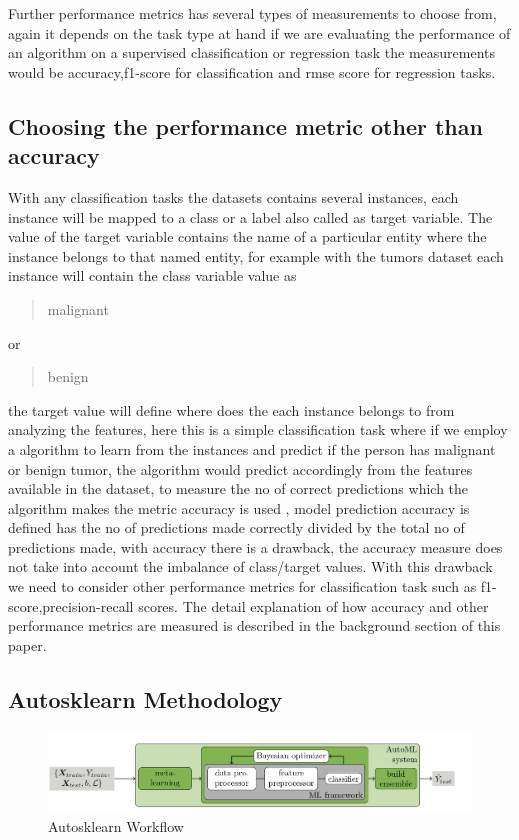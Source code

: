 Further performance metrics has several types of measurements to choose from, again it depends on the task type at hand if we are evaluating the performance of an algorithm on a supervised classification or regression task the measurements would be accuracy,f1-score for classification and rmse score for regression tasks.

\subsection{Choosing the performance metric other than accuracy}
    
 With any classification tasks the datasets contains several instances, each instance will be mapped to a class or a label also called as target variable. The value of the target variable contains the name of a particular entity where the instance belongs to that named entity, for example with the tumors dataset each instance will contain the class variable value as \blockquote{malignant} or \blockquote{benign} the target value will define where does the each instance belongs to from analyzing the features, here this is a simple classification task where if we employ a algorithm to learn from the instances and predict if the person has malignant or benign tumor, the algorithm would predict accordingly from the features available in the dataset, to measure the no of correct predictions which the algorithm makes the metric accuracy is used , model prediction accuracy is defined has the no of predictions made correctly divided by the total no of predictions made, with accuracy there is a drawback, the accuracy measure does not take into account the imbalance of class/target values. With this drawback we need to consider other performance metrics for classification task such as f1-score,precision-recall scores. The detail explanation of how accuracy and other performance metrics are measured is described in the background section of this paper.

 
    
\subsection{Autosklearn Methodology}
    
    \begin{figure}[!h]
    	\centering
    	\includegraphics[width=1.1\linewidth]{thesis_template/images/autosklearn.png}
    	\caption{Autosklearn Workflow}
    	\label{fig:autosklearn_workflow}
    \end{figure}
    
